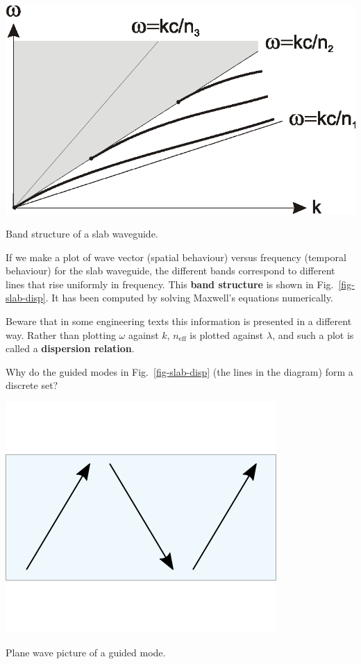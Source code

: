 \begin{marginfigure}
\centering
\includegraphics{symmetry/figures/slabdisp}
\caption{Band structure of a slab waveguide.}
\label{fig-slab-disp}
\end{marginfigure}

If we make a plot of wave vector (spatial behaviour) versus frequency (temporal behaviour) for the slab waveguide, the different bands correspond to different lines that rise uniformly in frequency. This \textbf{band structure} is shown in Fig.~\ref{fig-slab-disp}. It has been computed by solving Maxwell's equations numerically.

Beware that in some engineering texts this information is presented in a different way. Rather than plotting $\omega$ against $k$, $n_\mathrm{eff}$ is plotted against $\lambda$, and such a plot is called a \textbf{dispersion relation}.


\begin{cue}
  Why do the guided modes in Fig.~\ref{fig-slab-disp} (the lines in the diagram) form a discrete set?
\end{cue}

\begin{marginfigure}
\centering
\includegraphics{symmetry/figures/guided}
\caption{Plane wave picture of a guided mode.}
\label{fig-guided}
\end{marginfigure}

